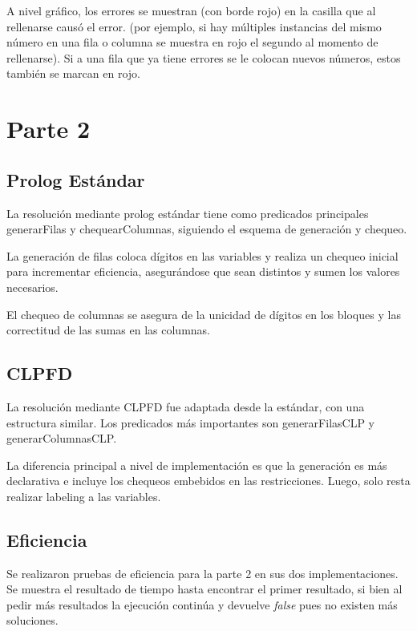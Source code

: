 \documentclass[]{article}
\begin{document}
A nivel gráfico, los errores se muestran (con borde rojo) en la casilla que al rellenarse causó el error. (por ejemplo, si hay múltiples instancias del mismo número en una fila o columna se muestra en rojo el segundo al momento de rellenarse). Si a una fila que ya tiene errores se le colocan nuevos números, estos también se marcan en rojo.

\section{Parte 2}
\subsection{Prolog Estándar}

La resolución mediante prolog estándar tiene como predicados principales generarFilas y chequearColumnas, siguiendo el esquema de generación y chequeo.

La generación de filas coloca dígitos en las variables y realiza un chequeo inicial para incrementar eficiencia, asegurándose que sean distintos y sumen los valores necesarios.

El chequeo de columnas se asegura de la unicidad de dígitos en los bloques y las correctitud de las sumas en las columnas.

\subsection{CLPFD}

La resolución mediante CLPFD fue adaptada desde la estándar, con una estructura similar. Los predicados más importantes son generarFilasCLP y generarColumnasCLP.

La diferencia principal a nivel de implementación es que la generación es más declarativa e incluye los chequeos embebidos en las restricciones. Luego, solo resta realizar labeling a las variables.

\subsection{Eficiencia}

Se realizaron pruebas de eficiencia para la parte 2 en sus dos implementaciones. Se muestra el resultado de tiempo hasta encontrar el primer resultado, si bien al pedir más resultados la ejecución continúa y devuelve \emph{false} pues no existen más soluciones.
\end{document}
